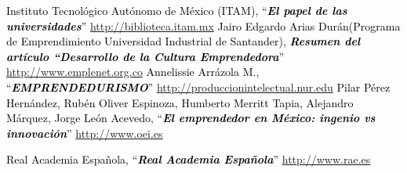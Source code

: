 \documentclass[11pt,letterpaper,titlepage]{article}
\begin{document}
\begin{thebibliography}{99}
 \textcolor{black}{Instituto Tecnol\'ogico Aut\'onomo de M\'exico (ITAM), ``\textbf{\textit{El papel de las universidades}}'' \href{http://biblioteca.itam.mx/estudios/estudio/letras39-40/texto10/sec\_2.html}{http://biblioteca.itam.mx} } 
 \textcolor{black}{Jairo Edgardo Arias Dur\'an(Programa de Emprendimiento Universidad Industrial de Santander), \textbf{\textit{Resumen del art\'iculo ``Desarrollo de la Cultura Emprendedora}}'' \\\href{http://www.emplenet.org.co/roce/documentos/desarrollo\%20de\%20la\%20cultura\%20emprendedora.pdf}{http://www.emplenet.org.co}}
 \textcolor{black}{Annelissie Arr\'azola M., ``\textbf{\textit{EMPRENDEDURISMO}}'' \href{http://produccionintelectual.nur.edu/archivos/emprendedurismo.pdf}{http://produccionintelectual.nur.edu}}
 \textcolor{black}{Pilar P\'erez Hern\'andez, Rub\'en Oliver Espinoza, Humberto Merritt Tapia, Alejandro M\'arquez, Jorge Le\'on Acevedo, ``\textbf{\textit{El emprendedor en M\'exico: ingenio vs innovaci\'on}}'' \href{http://www.oei.es/memoriasctsi/mesa12/m12p25.pdf}{http://www.oei.es} }


 \textcolor{black}{Real Academia Espa\~nola, ``\textbf{\textit{Real Academia Espa\~nola}}'' \href{http://www.rae.es}{http://www.rae.es}}

\end{thebibliography}
\end{document}
